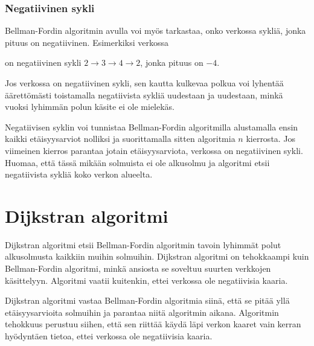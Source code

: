 \subsubsection{Negatiivinen sykli}

Bellman-Fordin algoritmin avulla voi myös tarkastaa,
onko verkossa sykliä,
jonka pituus on negatiivinen.
Esimerkiksi verkossa

\begin{center}
\end{center}
\noindent
on negatiivinen sykli $2 \rightarrow 3 \rightarrow 4 \rightarrow 2$,
jonka pituus on $-4$.

Jos verkossa on negatiivinen sykli,
sen kautta kulkevaa polkua voi lyhentää äärettömästi
toistamalla negatiivista sykliä uudestaan ja uudestaan,
minkä vuoksi lyhimmän polun käsite ei ole mielekäs.

Negatiivisen syklin voi tunnistaa
Bellman-Fordin algoritmilla
alustamalla ensin kaikki etäisyysarviot nolliksi
ja suorittamalla sitten
algoritmia $n$ kierrosta.
Jos viimeinen kierros parantaa jotain
etäisyysarviota, verkossa on negatiivinen sykli.
Huomaa, että tässä mikään solmuista ei ole alkusolmu
ja algoritmi etsii negatiivista sykliä koko verkon alueelta.

\section{Dijkstran algoritmi}

Dijkstran algoritmi etsii Bellman-Fordin
algoritmin tavoin lyhimmät polut
alkusolmusta kaikkiin muihin solmuihin.
Dijkstran algoritmi on tehokkaampi kuin
Bellman-Fordin algoritmi,
minkä ansiosta se soveltuu suurten
verkkojen käsittelyyn.
Algoritmi vaatii kuitenkin,
ettei verkossa ole negatiivisia kaaria.

Dijkstran algoritmi vastaa
Bellman-Fordin algoritmia siinä,
että se pitää
yllä etäisyysarvioita solmuihin
ja parantaa niitä algoritmin aikana.
Algoritmin tehokkuus perustuu
siihen, että sen riittää käydä läpi
verkon kaaret vain kerran
hyödyntäen tietoa,
ettei verkossa ole negatiivisia kaaria.

